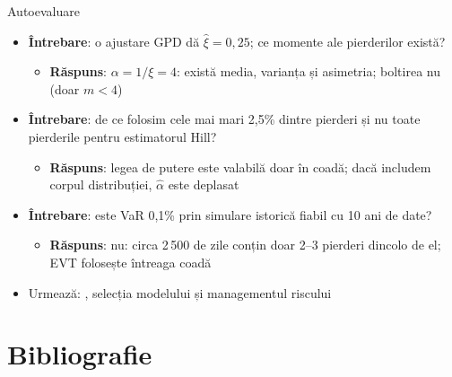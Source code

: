\begin{frame}{Autoevaluare}
\itemsize{\small}
\begin{itemize}
    \item \textbf{Întrebare}: o ajustare GPD dă $\hat\xi = 0{,}25$; ce momente ale pierderilor există?
    \begin{itemize}
        \item \textbf{Răspuns}: $\alpha = 1/\xi = 4$: există media, varianța și asimetria; boltirea nu (doar $m < 4$)
    \end{itemize}
    \item \textbf{Întrebare}: de ce folosim cele mai mari 2,5\% dintre pierderi și nu toate pierderile pentru estimatorul Hill?
    \begin{itemize}
        \item \textbf{Răspuns}: legea de putere este valabilă doar în coadă; dacă includem corpul distribuției, $\hat\alpha$ este deplasat
    \end{itemize}
    \item \textbf{Întrebare}: este VaR 0,1\% prin simulare istorică fiabil cu 10 ani de date?
    \begin{itemize}
        \item \textbf{Răspuns}: nu: circa 2\,500 de zile conțin doar 2--3 pierderi dincolo de el; EVT folosește întreaga coadă
    \end{itemize}
    \item Urmează: , selecția modelului și managementul riscului
\end{itemize}
\end{frame}


\section{Bibliografie}


